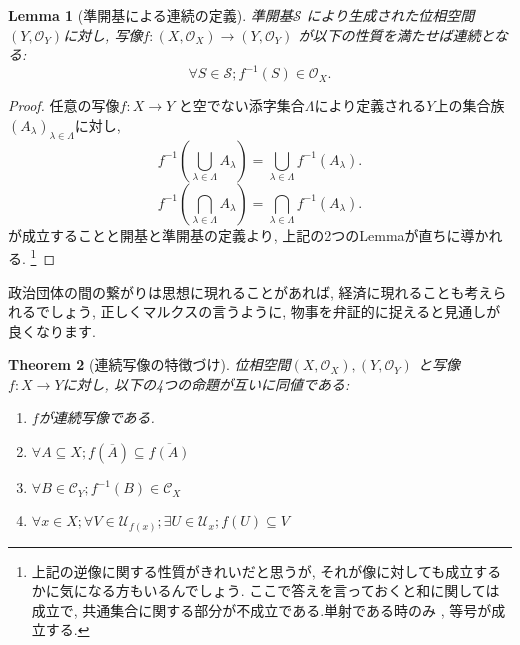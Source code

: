 \documentclass[lualatex]{ltjsbook}
\newcommand{\cl}[1]{\overline{ #1}  }
\newtheorem{theorem}{Theorem}[chapter]
\newtheorem{lemma}[theorem]{Lemma}
\theoremstyle{remark}
\theoremstyle{plain}
\begin{document}
\begin{lemma}[準開基による連続の定義]
	準開基$\mathcal{S}$ により生成された位相空間$\left( Y,  \mathcal{O}_Y \right) $に対し,  写像$f: \left( X ,  \mathcal{O}_X \right) \to \left( Y,  \mathcal{O}_Y \right) $ が以下の性質を満たせば連続となる:
\[
\forall S \in \mathcal{S}; f^{-1}\left( S \right) \in \mathcal{O}_X
.\] 

\end{lemma}

\begin{proof}
	任意の写像$f: X \to Y$ と空でない添字集合$\Lambda$により定義される$Y$上の集合族 $\left( A_{\lambda} \right) _{\lambda \in \Lambda}$に対し, 
	\[
	f^{-1}\left( \bigcup_{\lambda \in \Lambda} A_{\lambda}  \right) = \bigcup_{\lambda \in \Lambda} f^{-1}\left( A_\lambda \right) 
	.\] 
	\[
	f^{-1}\left( \bigcap_{\lambda \in \Lambda} A_{\lambda}  \right) = \bigcap_{\lambda \in \Lambda} f^{-1}\left( A_\lambda \right) 
	.\]
	が成立することと開基と準開基の定義より,  上記の2つのLemmaが直ちに導かれる. 
	\footnote{上記の逆像に関する性質がきれいだと思うが,  それが像に対しても成立するかに気になる方もいるんでしょう. 
	ここで答えを言っておくと和に関しては成立で,  共通集合に関する部分が{\color{red}不成立}である.単射である時のみ ,  等号が成立する.}
\end{proof}

政治団体の間の繋がりは思想に現れることがあれば,  経済に現れることも考えられるでしょう,  正しくマルクスの言うように,  物事を弁証的に捉えると見通しが良くなります.

\begin{theorem}[連続写像の特徴づけ]
	位相空間$\left( X, \mathcal{O}_X \right) , \left( Y, \mathcal{O}_Y \right) $ と写像$f:X \to Y$に対し,  以下の4つの命題が互いに同値である:
	\begin{enumerate}
		\item $f$が連続写像である.
		\item  $\forall A \subseteq X ; f\left( \cl{A} \right) \subseteq \cl{f\left( A \right) }$ 
		\item $\forall B \in \mathcal{C}_Y; f^{-1}\left( B \right)  \in \mathcal{C}_X$ 
		\item $\forall x \in X; \forall V \in \mathcal{U}_{f(x)};\exists U \in \mathcal{U}_x; f(U) \subseteq V $
	\end{enumerate}
\end{theorem}
\end{document}
